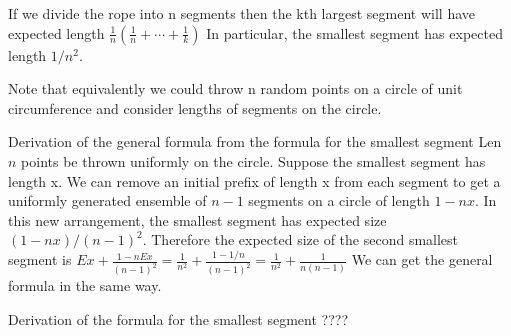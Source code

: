 If we divide the rope into n segments then the kth largest segment will have expected length
$ \frac{1}{n} \left( \frac{1}{n} + \cdots + \frac{1}{k} \right) $
In particular, the smallest segment has expected length $ 1/n^2 $.

Note that equivalently we could throw n random points on a circle of unit circumference and consider lengths of segments on the circle.

Derivation of the general formula from the formula for the smallest segment
Len $n$ points be thrown uniformly on the circle. Suppose the smallest segment has length x. We can remove an initial prefix of length x from each segment to get a uniformly generated ensemble of $n-1$ segments on a circle of length $1-nx$. In this new arrangement, the smallest segment has expected size $ (1-nx)/(n-1)^2 $. Therefore the expected size of the second smallest segment is
$Ex + \frac{1-nEx}{(n-1)^2} = \frac{1}{n^2} + \frac{1-1/n}{(n-1)^2} = \frac{1}{n^2} + \frac{1}{n(n-1)}$
We can get the general formula in the same way.

Derivation of the formula for the smallest segment
????
